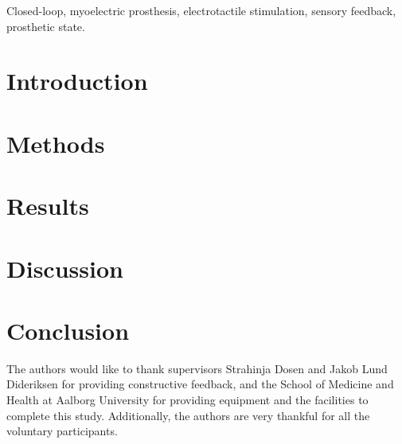 \documentclass[journal]{IEEEtran}
\begin{document}
\begin{IEEEkeywords}
Closed-loop, myoelectric prosthesis, electrotactile stimulation, sensory feedback, prosthetic state. 
\end{IEEEkeywords}

\IEEEpeerreviewmaketitle

\section{Introduction}
 

\section{Methods}























\section{Results}



\section{Discussion}



\section{Conclusion}



\appendix[Acknowledgement]
The authors would like to thank supervisors Strahinja Dosen and Jakob Lund Dideriksen for providing constructive feedback, and the School of Medicine and Health at Aalborg University for providing equipment and the facilities to complete this study. Additionally, the authors are very thankful for all the voluntary participants. 


\end{document}
